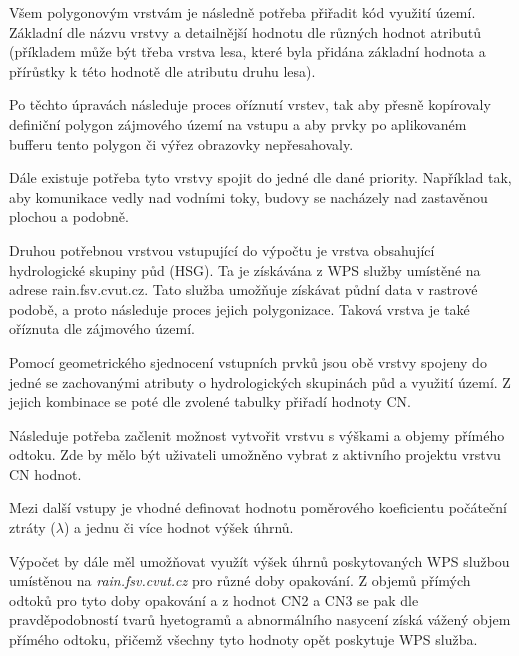 \documentclass[a4paper,oneside,12pt]{book}
\begin{document}
\hspace{10mm}Všem polygonovým vrstvám je následně potřeba přiřadit kód využití území. Základní dle názvu vrstvy a detailnější hodnotu dle různých hodnot atributů (příkladem může být třeba vrstva lesa, které byla přidána základní hodnota a přírůstky k této hodnotě dle atributu druhu lesa).

\hspace{10mm}Po těchto úpravách následuje proces oříznutí vrstev, tak aby přesně kopírovaly definiční polygon zájmového území na vstupu a aby prvky po aplikovaném bufferu tento polygon či výřez obrazovky nepřesahovaly.

\hspace{10mm}Dále existuje potřeba tyto vrstvy spojit do jedné dle dané priority. Například tak, aby komunikace vedly nad vodními toky, budovy se nacházely nad zastavěnou plochou a podobně.

\hspace{10mm}Druhou potřebnou vrstvou vstupující do výpočtu je vrstva obsahující hydrologické skupiny půd (HSG). Ta je získávána z WPS služby umístěné na adrese rain.fsv.cvut.cz. Tato služba umožňuje získávat půdní data v rastrové podobě, a proto následuje proces jejich polygonizace. Taková vrstva je také oříznuta dle zájmového území.

\hspace{10mm}Pomocí geometrického sjednocení vstupních prvků jsou obě vrstvy spojeny do jedné se zachovanými atributy o hydrologických skupinách půd a využití území.
Z jejich kombinace se poté dle zvolené tabulky přiřadí hodnoty CN.

\hspace{10mm} Následuje potřeba začlenit možnost vytvořit vrstvu s výškami a objemy přímého odtoku. Zde by mělo být uživateli umožněno vybrat z aktivního projektu vrstvu CN hodnot.

\hspace{10mm} Mezi další vstupy je vhodné definovat hodnotu poměrového koeficientu počáteční ztráty ($\lambda$) a jednu či více hodnot výšek úhrnů.

\hspace{10mm} Výpočet by dále měl umožňovat využít výšek úhrnů poskytovaných WPS službou umístěnou na \textit{rain.fsv.cvut.cz} pro různé doby opakování.  
Z objemů přímých odtoků pro tyto doby opakování a z hodnot CN2 a CN3 se pak dle pravděpodobností tvarů hyetogramů a abnormálního nasycení získá vážený objem přímého odtoku, přičemž všechny tyto hodnoty opět poskytuje WPS služba.
\end{document}

